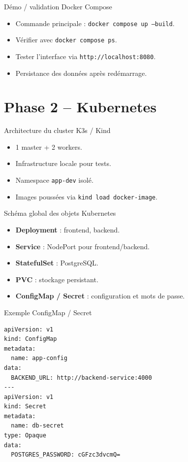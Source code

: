 \documentclass[11pt]{beamer}
\begin{document}
\begin{frame}{Démo / validation Docker Compose}
  \begin{itemize}
    \item Commande principale : \texttt{docker compose up --build}.
    \item Vérifier avec \texttt{docker compose ps}.
    \item Tester l'interface via \texttt{http://localhost:8080}.
    \item Persistance des données après redémarrage.
  \end{itemize}
\end{frame}

\section{Phase 2 -- Kubernetes}
\begin{frame}{Architecture du cluster K3s / Kind}
  \begin{itemize}
    \item 1 master + 2 workers.
    \item Infrastructure locale pour tests.
    \item Namespace \texttt{app-dev} isolé.
    \item Images poussées via \texttt{kind load docker-image}.
  \end{itemize}
\end{frame}

\begin{frame}{Schéma global des objets Kubernetes}
  \begin{itemize}
    \item \textbf{Deployment} : frontend, backend.
    \item \textbf{Service} : NodePort pour frontend/backend.
    \item \textbf{StatefulSet} : PostgreSQL.
    \item \textbf{PVC} : stockage persistant.
    \item \textbf{ConfigMap / Secret} : configuration et mots de passe.
  \end{itemize}
\end{frame}

\begin{frame}[fragile]{Exemple ConfigMap / Secret}
\begin{lstlisting}
apiVersion: v1
kind: ConfigMap
metadata:
  name: app-config
data:
  BACKEND_URL: http://backend-service:4000
---
apiVersion: v1
kind: Secret
metadata:
  name: db-secret
type: Opaque
data:
  POSTGRES_PASSWORD: cGFzc3dvcmQ=
\end{lstlisting}
\end{frame}
\end{document}
